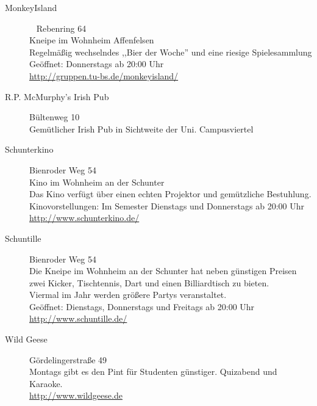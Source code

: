 \begin{multicols}{2}
\begin{description}
		\item[MonkeyIsland]~ \hfill Rebenring 64\\
		Kneipe im Wohnheim Affenfelsen\\
		Regelmäßig wechselndes ,,Bier der Woche'' und eine riesige
		Spielesammlung\\
		Geöffnet: Donnerstags ab 20:00 Uhr\\
		\url{http://gruppen.tu-bs.de/monkeyisland/}

		\item[R.P. McMurphy's Irish Pub] \hfill Bültenweg 10\\
		Gemütlicher Irish Pub in Sichtweite der Uni.
		Campusviertel
 
 		\item[Schunterkino] \small{Bienroder Weg 54}\\
	 	Kino im Wohnheim an der Schunter\\
	 	Das Kino verfügt über einen echten Projektor und gemützliche Bestuhlung.\\
		Kinovorstellungen: Im Semester Dienstags und Donnerstags ab 20:00 Uhr\\
		\url{http://www.schunterkino.de/}\\
 		
 		\item[Schuntille] \small{Bienroder Weg 54}\\
 		Die Kneipe im Wohnheim an der Schunter hat neben günstigen Preisen zwei Kicker, Tischtennis, Dart und einen Billiardtisch zu bieten.\\
	 	Viermal im Jahr werden größere Partys veranstaltet.\\
	 	Geöffnet: Dienstags, Donnerstags und Freitags ab 20:00 Uhr
	 	\url{http://www.schuntille.de/}
	
		\item[Wild Geese] \hfill Gördelingerstraße 49\\
		Montags gibt es den Pint für Studenten günstiger.
		Quizabend und Karaoke.\\
		\url{http://www.wildgeese.de}
	\end{description}
\end{multicols}